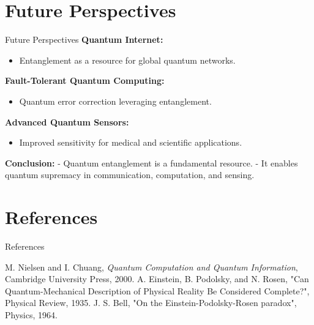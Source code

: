 \documentclass{beamer}
\begin{document}
\section{Future Perspectives}
\begin{frame}{Future Perspectives}
\textbf{Quantum Internet:}
\begin{itemize}
    \item Entanglement as a resource for global quantum networks.
\end{itemize}

\textbf{Fault-Tolerant Quantum Computing:}
\begin{itemize}
    \item Quantum error correction leveraging entanglement.
\end{itemize}

\textbf{Advanced Quantum Sensors:}
\begin{itemize}
    \item Improved sensitivity for medical and scientific applications.
\end{itemize}

\pause
\textbf{Conclusion:}
- Quantum entanglement is a fundamental resource.  
- It enables quantum supremacy in communication, computation, and sensing.
\end{frame}

\section{References}
\begin{frame}{References}
\begin{thebibliography}{9}
 M. Nielsen and I. Chuang, \textit{Quantum Computation and Quantum Information}, Cambridge University Press, 2000.
 A. Einstein, B. Podolsky, and N. Rosen, "Can Quantum-Mechanical Description of Physical Reality Be Considered Complete?", Physical Review, 1935.
 J. S. Bell, "On the Einstein-Podolsky-Rosen paradox", Physics, 1964.
\end{thebibliography}
\end{frame}
\end{document}

